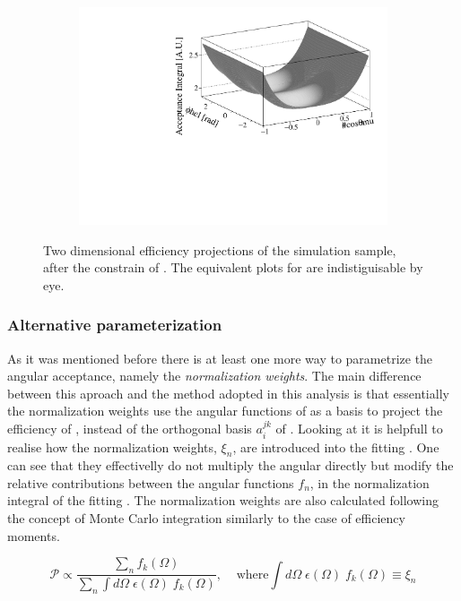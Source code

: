 \begin{figure}[h]
\begin{subfigure}{0.5\textwidth}
    \includegraphics[width=\textwidth]{Figures/Chapter4/canv_cosThL_phi_Sim08_3fb_hel_negKaons_all.pdf}
    \caption{}
    \label{eff2D_lp}
  \end{subfigure}
\caption{Two dimensional efficiency projections of the \BsJpsiKst simulation sample, after the constrain of .
         The equivalent plots for \BsbarJpsiKst are indistiguisable by eye.}
    \label{eff2D}
\end{figure}

\subsubsection{Alternative parameterization}
As it was mentioned before there is at least one more way to parametrize the angular acceptance, namely the \emph{normalization weights}.
The main difference between this aproach and the method adopted in this analysis is that essentially the normalization weights use the angular functions
of  as a basis to project the efficiency of , instead of the orthogonal basis $a_i^{jk}$ of .
Looking at  it is helpfull to realise how the normalization weights, $\xi_n$, are introduced into the fitting \pdf. 
One can see that they effectivelly do not multiply the angular \pdf directly but modify the relative contributions between the angular functions
$f_n$, in the normalization integral of the fitting \pdf. The normalization weights are also calculated following the concept of Monte Carlo integration
similarly to the case of efficiency moments.

\begin{equation}
  \mathcal{P} \propto \frac{\sum_n f_k(\Omega)}{\sum_n \int d\Omega \; \epsilon(\Omega) \; f_k(\Omega)}, \;\;\;\;\text{where} \int d\Omega \; \epsilon(\Omega) \; f_k(\Omega) \equiv \xi_n 
  \label{norm_weights_pdf}
\end{equation}

